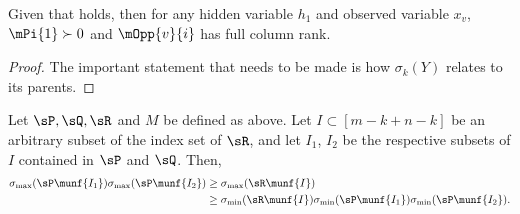 \begin{lemma}
  \label{lem:full-rank-suff}
  Given that  holds, then for any hidden
  variable $h_1$ and observed variable $x_v$, $\mPi{1} \succ 0$ and
  $\mOpp{v}{i}$ has full column rank.
\end{lemma}
\begin{proof}
  The important statement that needs to be made is how $\sigma_k(Y)$
  relates to its parents.
\end{proof}

\begin{lemma}
  \label{lem:tensor-multiplication}
Let $\sP, \sQ, \sR$ and $M$ be defined as above. 
Let $I \subset [m - k + n - k]$ be an arbitrary subset of the index set of $\sR$,
  and let $I_1$, $I_2$ be the respective subsets of $I$ contained in $\sP$ and $\sQ$.
Then,
\begin{align*}
  \sigma_{\max}(\sP\munf{I_1}) \sigma_{\max}(\sP\munf{I_2}) 
&\ge \sigma_{\max}(\sR\munf{I})  \\
&\ge \sigma_{\min}(\sR\munf{I}) 
\sigma_{\min}(\sP\munf{I_1}) \sigma_{\min}(\sP\munf{I_2}).
\end{align*}
\end{lemma}
